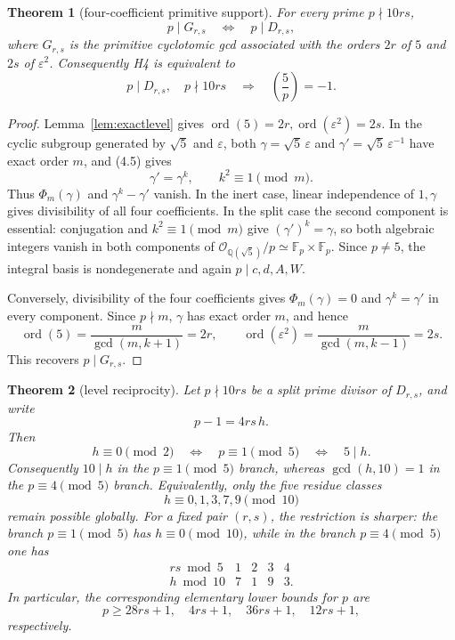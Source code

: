 \documentclass[11pt]{amsart}
\newtheorem{theorem}{Theorem}[section]
\theoremstyle{definition}
\theoremstyle{remark}
\newcommand{\F}{\mathbb{F}}
\newcommand{\Q}{\mathbb{Q}}
\newcommand{\eps}{\varepsilon}
\newcommand{\ord}{\operatorname{ord}}
\begin{document}
\begin{theorem}[four-coefficient primitive support]
\label{thm:Hfour}
For every prime \(p\nmid10rs\),
\[
p\mid G_{r,s}\quad\Longleftrightarrow\quad p\mid D_{r,s},
\tag{4.7}
\]
where \(G_{r,s}\) is the primitive cyclotomic gcd associated with the
orders \(2r\) of \(5\) and \(2s\) of \(\eps^2\). Consequently H4 is
equivalent to
\[
p\mid D_{r,s},\quad p\nmid10rs
\quad\Longrightarrow\quad
\left(\frac5p\right)=-1.
\tag{4.8}
\]
\end{theorem}

\begin{proof}
Lemma~\ref{lem:exactlevel} gives
\(\ord(5)=2r,\ord(\eps^2)=2s\). In the cyclic subgroup generated by
\(\sqrt5\) and \(\eps\), both
\(\gamma=\sqrt5\,\eps\) and \(\gamma'=\sqrt5\,\eps^{-1}\) have exact
order \(m\), and (4.5) gives
\[
\gamma'=\gamma^k,\qquad k^2\equiv1\pmod m.
\]
Thus \(\Phi_m(\gamma)\) and \(\gamma^k-\gamma'\) vanish. In the inert
case, linear independence of \(1,\gamma\) gives divisibility of all four
coefficients. In the split case the second component is essential:
conjugation and \(k^2\equiv1\pmod m\) give
\((\gamma')^k=\gamma\), so both algebraic integers vanish in both
components of
\(\mathcal O_{\Q(\sqrt5)}/p\simeq\F_p\times\F_p\). Since \(p\ne5\),
the integral basis is nondegenerate and again \(p\mid c,d,A,W\).

Conversely, divisibility of the four coefficients gives
\(\Phi_m(\gamma)=0\) and \(\gamma^k=\gamma'\) in every component.
Since \(p\nmid m\), \(\gamma\) has exact order \(m\), and hence
\[
\ord(5)=\frac m{\gcd(m,k+1)}=2r,\qquad
\ord(\eps^2)=\frac m{\gcd(m,k-1)}=2s.
\]
This recovers \(p\mid G_{r,s}\).
\end{proof}

\begin{theorem}[level reciprocity]\label{thm:levelreciprocity}
Let \(p\nmid10rs\) be a split prime divisor of \(D_{r,s}\), and write
\[
 p-1=4rs\,h.
\]
Then
\[
\boxed{\quad h\equiv0\pmod2
\quad\Longleftrightarrow\quad
p\equiv1\pmod5
\quad\Longleftrightarrow\quad
5\mid h.\quad}
\tag{4.9}
\]
Consequently \(10\mid h\) in the \(p\equiv1\pmod5\) branch, whereas
\(\gcd(h,10)=1\) in the \(p\equiv4\pmod5\) branch.  Equivalently, only
the five residue classes
\[
 h\equiv0,1,3,7,9\pmod {10}
\]
remain possible globally.  For a fixed pair \((r,s)\), the restriction
is sharper: the branch \(p\equiv1\pmod5\) has \(h\equiv0\pmod {10}\),
while in the branch \(p\equiv4\pmod5\) one has
\[
\begin{array}{c|cccc}
rs\bmod5&1&2&3&4\\ \hline
h\bmod10&7&1&9&3.
\end{array}
\tag{4.10}
\]
In particular, the corresponding elementary lower bounds for \(p\) are
\[
p\ge 28rs+1,\quad4rs+1,\quad36rs+1,\quad12rs+1,
\]
respectively.
\end{theorem}
\end{document}
